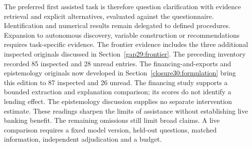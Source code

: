 The preferred first assisted task is therefore question clarification
with evidence retrieval and explicit alternatives, evaluated against
the questionnaire. Identification and numerical results remain delegated
to defined procedures. Expansion to autonomous discovery, variable
construction or recommendations requires task-specific evidence. The
frontier evidence includes the three additional inspected originals discussed
in Section~\ref{gap29:frontier}. The preceding inventory recorded 85 inspected
and 28 unread entries. The financing-and-exports and epistemology originals
now developed in Section~\ref{closure30:formulation} bring this edition to
87 inspected and 26 unread. The financing study supports a bounded extraction
and explanation comparison; its scores do not identify a lending effect.
The epistemology discussion supplies no separate intervention estimate. These
readings sharpen the limits of assistance without establishing live banking
benefit. The remaining omissions still limit broad claims. A live comparison
requires a fixed model version, held-out questions, matched information,
independent adjudication and a budget.~\citep{rel18li,rel18mugleston}



